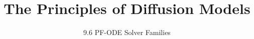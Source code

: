 
\title{The Principles of Diffusion Models}
\subtitle{9.6 PF-ODE Solver Families}


\begin{frame}
    \titlepage
\end{frame}


